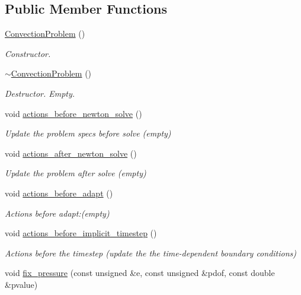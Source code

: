 \subsection*{Public Member Functions}
\begin{DoxyCompactItemize}
\item 
\hyperlink{classConvectionProblem_a0c68c4c4b67d9fc8c9900fc895eed973}{Convection\+Problem} ()
\begin{DoxyCompactList}\small\item\em Constructor. \end{DoxyCompactList}\item 
\hyperlink{classConvectionProblem_a77c37355ba683b5b1ec11d096ce4d760}{$\sim$\+Convection\+Problem} ()
\begin{DoxyCompactList}\small\item\em Destructor. Empty. \end{DoxyCompactList}\item 
void \hyperlink{classConvectionProblem_a2fe48dd44ece8a0a69539ffcdce9ec11}{actions\+\_\+before\+\_\+newton\+\_\+solve} ()
\begin{DoxyCompactList}\small\item\em Update the problem specs before solve (empty) \end{DoxyCompactList}\item 
void \hyperlink{classConvectionProblem_a6b6c035decf5f1e2aa64b591563e5ae4}{actions\+\_\+after\+\_\+newton\+\_\+solve} ()
\begin{DoxyCompactList}\small\item\em Update the problem after solve (empty) \end{DoxyCompactList}\item 
void \hyperlink{classConvectionProblem_ac546cecdb98a75923d0a5af4b0a223a1}{actions\+\_\+before\+\_\+adapt} ()
\begin{DoxyCompactList}\small\item\em Actions before adapt\+:(empty) \end{DoxyCompactList}\item 
void \hyperlink{classConvectionProblem_a37c80882d173c02bfb3dfca924a4ec61}{actions\+\_\+before\+\_\+implicit\+\_\+timestep} ()
\begin{DoxyCompactList}\small\item\em Actions before the timestep (update the the time-\/dependent boundary conditions) \end{DoxyCompactList}\item 
void \hyperlink{classConvectionProblem_a5f4904e658a5888814e825ac060c8f71}{fix\+\_\+pressure} (const unsigned \&e, const unsigned \&pdof, const double \&pvalue)

\end{DoxyCompactItemize}
